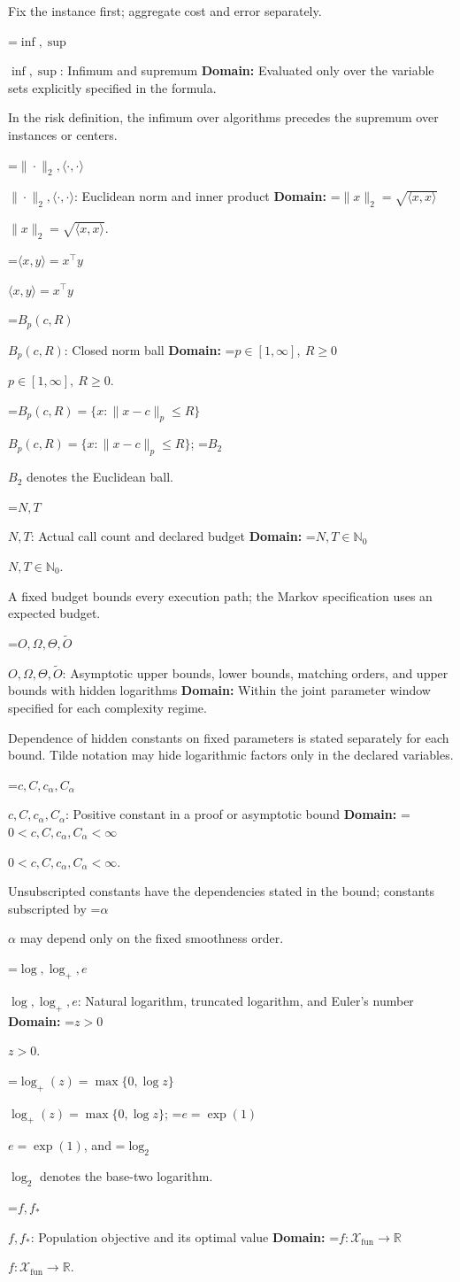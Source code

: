 \documentclass[10pt,a4paper]{article}
\newcommand{\AtlasMath}[1]{\par\begingroup\centering\setbox0=\hbox{$\displaystyle #1$}\ifdim\wd0>1.4\linewidth\typeout{ATLAS WIDE FORMULA: \the\wd0}\fi\ifdim\wd0>\linewidth\resizebox{\linewidth}{!}{\box0}\else\box0\fi\par\endgroup}
\newcommand{\AtlasInlineMath}[1]{\begingroup\setbox0=\hbox{$#1$}\ifdim\wd0>.4\linewidth\endgroup\AtlasMath{#1}\else\endgroup$#1$\fi}
\begin{document}
Fix the instance first; aggregate cost and error separately.

\AtlasInlineMath{\inf,\sup}: Infimum and supremum \textbf{Domain:} Evaluated only over the variable sets explicitly specified in the formula.

In the risk definition, the infimum over algorithms precedes the supremum over instances or centers.

\AtlasInlineMath{\|\cdot\|_2,\langle\cdot,\cdot\rangle}: Euclidean norm and inner product \textbf{Domain:} \AtlasInlineMath{\|x\|_2=\sqrt{\langle x,x\rangle}}.

\AtlasInlineMath{\langle x,y\rangle=x^\top y}

\AtlasInlineMath{B_p(c,R)}: Closed norm ball \textbf{Domain:} \AtlasInlineMath{p\in[1,\infty],\ R\ge0}.

\AtlasInlineMath{B_p(c,R)=\{x:\|x-c\|_p\le R\}}; \AtlasInlineMath{B_2} denotes the Euclidean ball.

\AtlasInlineMath{N,T}: Actual call count and declared budget \textbf{Domain:} \AtlasInlineMath{N,T\in\mathbb{N}_0}.

A fixed budget bounds every execution path; the Markov specification uses an expected budget.

\AtlasInlineMath{O,\Omega,\Theta,\widetilde{O}}: Asymptotic upper bounds, lower bounds, matching orders, and upper bounds with hidden logarithms \textbf{Domain:} Within the joint parameter window specified for each complexity regime.

Dependence of hidden constants on fixed parameters is stated separately for each bound. Tilde notation may hide logarithmic factors only in the declared variables.

\AtlasInlineMath{c,C,c_\alpha,C_\alpha}: Positive constant in a proof or asymptotic bound \textbf{Domain:} \AtlasInlineMath{0<c,C,c_\alpha,C_\alpha<\infty}.

Unsubscripted constants have the dependencies stated in the bound; constants subscripted by \AtlasInlineMath{\alpha} may depend only on the fixed smoothness order.

\AtlasInlineMath{\log,\log_+,e}: Natural logarithm, truncated logarithm, and Euler's number \textbf{Domain:} \AtlasInlineMath{z>0}.

\AtlasInlineMath{\log_+(z)=\max\{0,\log z\}}; \AtlasInlineMath{e=\exp(1)}, and \AtlasInlineMath{\log_2} denotes the base-two logarithm.

\AtlasInlineMath{f,f_*}: Population objective and its optimal value \textbf{Domain:} \AtlasInlineMath{f:\mathcal{X}_{\mathrm{fun}}\to\mathbb{R}}.
\end{document}
